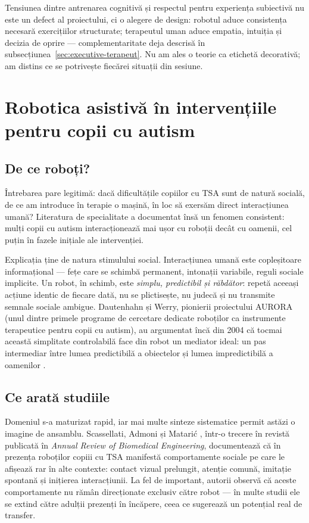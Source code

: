 Tensiunea dintre antrenarea cognitivă și respectul pentru experiența subiectivă nu este un defect al proiectului, ci o alegere de design: robotul aduce consistența necesară exercițiilor structurate; terapeutul uman aduce empatia, intuiția și decizia de oprire — complementaritate deja descrisă în subsecțiunea~\ref{sec:executive-terapeut}. Nu am ales o teorie ca etichetă decorativă; am distins ce se potrivește fiecărei situații din sesiune.

\section{Robotica asistivă în intervențiile pentru copii cu autism}

\subsection{De ce roboți?}

Întrebarea pare legitimă: dacă dificultățile copiilor cu TSA sunt de natură socială, de ce am introduce în terapie o mașină, în loc să exersăm direct interacțiunea umană? Literatura de specialitate a documentat însă un fenomen consistent: mulți copii cu autism interacționează mai ușor cu roboții decât cu oamenii, cel puțin în fazele inițiale ale intervenției.

Explicația ține de natura stimulului social. Interacțiunea umană este copleșitoare informațional — fețe care se schimbă permanent, intonații variabile, reguli sociale implicite. Un robot, în schimb, este \emph{simplu, predictibil și răbdător}: repetă aceeași acțiune identic de fiecare dată, nu se plictisește, nu judecă și nu transmite semnale sociale ambigue. Dautenhahn și Werry, pionierii proiectului AURORA (unul dintre primele programe de cercetare dedicate roboților ca instrumente terapeutice pentru copii cu autism), au argumentat încă din 2004 că tocmai această simplitate controlabilă face din robot un mediator ideal: un pas intermediar între lumea predictibilă a obiectelor și lumea impredictibilă a oamenilor \cite{dautenhahn2004}.

\subsection{Ce arată studiile}

Domeniul s-a maturizat rapid, iar mai multe sinteze sistematice permit astăzi o imagine de ansamblu. Scassellati, Admoni și Matarić \cite{scassellati2012}, într-o trecere în revistă publicată în \emph{Annual Review of Biomedical Engineering}, documentează că în prezența roboților copiii cu TSA manifestă comportamente sociale pe care le afișează rar în alte contexte: contact vizual prelungit, atenție comună, imitație spontană și inițierea interacțiunii. La fel de important, autorii observă că aceste comportamente nu rămân direcționate exclusiv către robot — în multe studii ele se extind către adulții prezenți în încăpere, ceea ce sugerează un potențial real de transfer.

